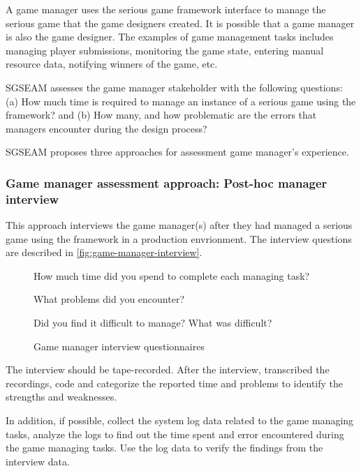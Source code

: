 \documentclass[11pt,oneside]{book}
\begin{document}
A game manager uses the serious game framework interface to manage the serious game that the game
designers created. It is possible that a game manager is also the game designer.
The examples of game management tasks includes managing player submissions, monitoring the game 
state, entering manual resource data, notifying winners of the game, etc.

SGSEAM assesses the game manager stakeholder with the following questions: (a) How much time is
required to manage an instance of a serious game using the framework? and (b) How many,
and how problematic are the errors that managers encounter during the design process?

SGSEAM proposes three approaches for assessment game manager's experience.

\subsubsection{Game manager assessment approach: Post-hoc manager interview}
\label{Post-hoc game manager interview}

This approach interviews the game manager(s) after they had managed a serious game using the framework 
in a production envrionment. The interview questions are described in \autoref{fig:game-manager-interview}.
 
\begin{figure}[ht!]
\begin{mybox}
\begin{compactenum}
\item How much time did you spend to complete each managing task?
\item What problems did you encounter?
\item Did you find it difficult to manage? What was difficult?
\end{compactenum}
\end{mybox}
\caption{Game manager interview questionnaires}
\label{fig:game-manager-interview}  
\end{figure}

The interview should be tape-recorded. After the interview, transcribed the recordings, code and categorize the reported 
time and problems to identify the strengths and weaknesses.

In addition, if possible, collect the system log data related to the game managing tasks, analyze the logs to find out the time 
spent and error encountered during the game managing tasks. Use the log data to verify the findings from the interview data.
\end{document}
